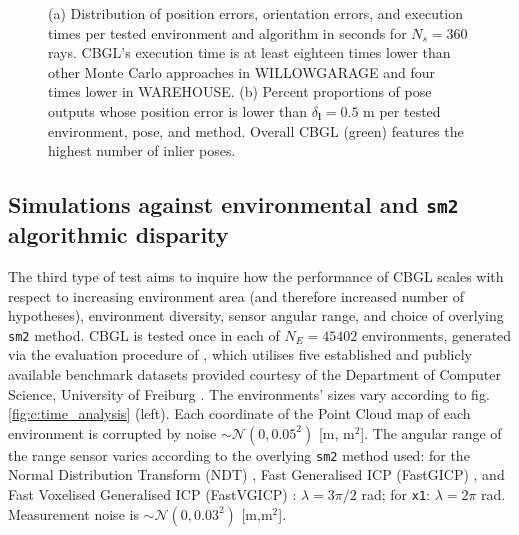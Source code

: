 \begin{figure}[tbp]
\centering
  \vspace{-0.1cm}
  \caption{\small (a) \small Distribution of position errors, orientation
           errors, and execution times per tested environment and algorithm in
           seconds for $N_s = 360$ rays. CBGL's execution time is at least
           eighteen times lower than other Monte Carlo approaches in
           WILLOWGARAGE and four times lower in WAREHOUSE. (b) Percent
           proportions of pose outputs whose position error is lower than
           $\delta_{\bm{l}} = 0.5$ m per tested environment, pose, and method.
           Overall CBGL (green) features the highest number of inlier poses.
           }
  \vspace{-0.5cm}
\end{figure}


\subsection{Simulations against environmental and \texttt{sm2} algorithmic disparity}
\label{subsec:exp_c}

The third type of test aims to inquire how the performance of CBGL scales with
respect to increasing environment area (and therefore increased number of
hypotheses), environment diversity, sensor angular range, and choice of
overlying \texttt{sm2} method. CBGL is tested once in each of $N_E =
45402$ environments, generated via the evaluation procedure of
\cite{Filotheou2023a}, which utilises five established and publicly available
benchmark datasets provided courtesy of the Department of Computer Science,
University of Freiburg \cite{datasets_link}. The environments' sizes vary
according to fig. \ref{fig:c:time_analysis} (left). Each coordinate of the
Point Cloud map of each environment is corrupted by noise
$\sim\mathcal{N}(0,0.05^2)$ [m, m$^2$].  The angular range of the range sensor
varies according to the overlying \texttt{sm2} method used: for the Normal
Distribution Transform (NDT) \cite{ndt}, Fast Generalised ICP (FastGICP)
\cite{fgi}, and Fast Voxelised Generalised ICP (FastVGICP) \cite{fvg}: $\lambda
= 3\pi/2$ rad; for \texttt{x1}: $\lambda = 2\pi$ rad. Measurement noise is
$\sim \mathcal{N}(0,0.03^2)$ [m,m$^2$].

